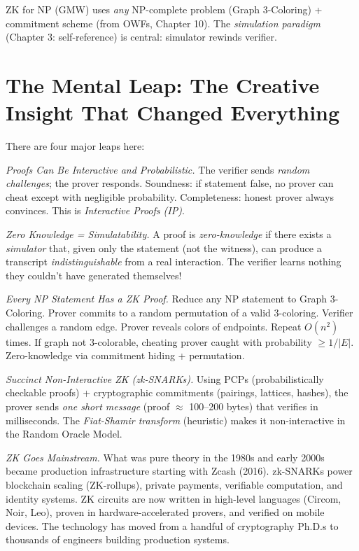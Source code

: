 ZK for NP (GMW) uses \emph{any} NP-complete problem (Graph 3-Coloring) + commitment scheme (from OWFs, Chapter 10). The \emph{simulation paradigm} (Chapter 3: self-reference) is central: simulator rewinds verifier.

\section{The Mental Leap: The Creative Insight That Changed Everything}
\label{sec:zk:leap}

There are four major leaps here:

\emph{Proofs Can Be Interactive and Probabilistic.}
The verifier sends \emph{random challenges}; the prover responds. Soundness: if statement false, no prover can cheat except with negligible probability. Completeness: honest prover always convinces. This is \emph{Interactive Proofs (IP)}.

\emph{Zero Knowledge = Simulatability.}
A proof is \emph{zero-knowledge} if there exists a \emph{simulator} that, given only the statement (not the witness), can produce a transcript \emph{indistinguishable} from a real interaction. The verifier learns nothing they couldn't have generated themselves!

\emph{Every NP Statement Has a ZK Proof.}
Reduce any NP statement to Graph 3-Coloring. Prover commits to a random permutation of a valid 3-coloring. Verifier challenges a random edge. Prover reveals colors of endpoints. Repeat $O(n^2)$ times. If graph not 3-colorable, cheating prover caught with probability $\ge 1/|E|$. Zero-knowledge via commitment hiding + permutation.

\emph{Succinct Non-Interactive ZK (zk-SNARKs).}
Using PCPs (probabilistically checkable proofs) + cryptographic commitments (pairings, lattices, hashes), the prover sends \emph{one short message} (proof $\approx$ 100--200 bytes) that verifies in milliseconds. The \emph{Fiat-Shamir transform} (heuristic) makes it non-interactive in the Random Oracle Model.

\emph{ZK Goes Mainstream.}
What was pure theory in the 1980s and early 2000s became production infrastructure starting with Zcash (2016). zk-SNARKs power blockchain scaling (ZK-rollups), private payments, verifiable computation, and identity systems. ZK circuits are now written in high-level languages (Circom, Noir, Leo), proven in hardware-accelerated provers, and verified on mobile devices. The technology has moved from a handful of cryptography Ph.D.s to thousands of engineers building production systems.

